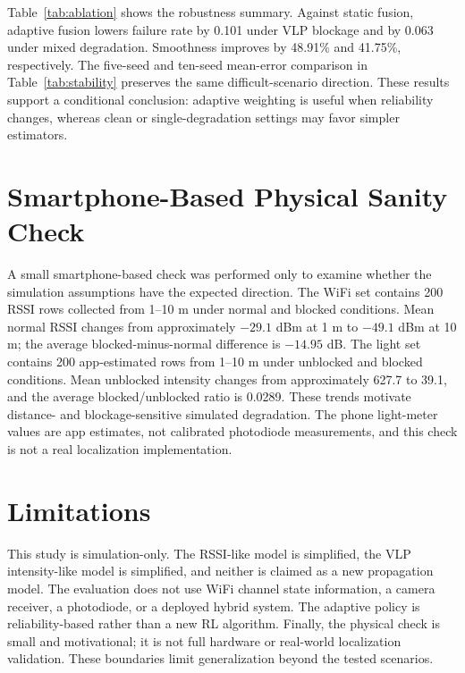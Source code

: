 \documentclass[conference]{IEEEtran}
\begin{document}
Table~\ref{tab:ablation} shows the robustness summary. Against static fusion, adaptive fusion lowers failure rate by 0.101 under VLP blockage and by 0.063 under mixed degradation. Smoothness improves by 48.91\% and 41.75\%, respectively. The five-seed and ten-seed mean-error comparison in Table~\ref{tab:stability} preserves the same difficult-scenario direction. These results support a conditional conclusion: adaptive weighting is useful when reliability changes, whereas clean or single-degradation settings may favor simpler estimators.

\begin{table}[t]
\caption{Ablation on Difficult Scenarios (lower is better)}
\label{tab:ablation}
\centering
\tiny

\end{table}
\begin{table}[t]
\caption{Mean-Error Stability as Held-Out Seeds Expand (m; lower is better)}
\label{tab:stability}
\centering
\scriptsize

\end{table}

\section{Smartphone-Based Physical Sanity Check}
A small smartphone-based check was performed only to examine whether the simulation assumptions have the expected direction. The WiFi set contains 200 RSSI rows collected from 1--10 m under normal and blocked conditions. Mean normal RSSI changes from approximately $-29.1$ dBm at 1 m to $-49.1$ dBm at 10 m; the average blocked-minus-normal difference is $-14.95$ dB. The light set contains 200 app-estimated rows from 1--10 m under unblocked and blocked conditions. Mean unblocked intensity changes from approximately 627.7 to 39.1, and the average blocked/unblocked ratio is 0.0289. These trends motivate distance- and blockage-sensitive simulated degradation. The phone light-meter values are app estimates, not calibrated photodiode measurements, and this check is not a real localization implementation.

\section{Limitations}
This study is simulation-only. The RSSI-like model is simplified, the VLP intensity-like model is simplified, and neither is claimed as a new propagation model. The evaluation does not use WiFi channel state information, a camera receiver, a photodiode, or a deployed hybrid system. The adaptive policy is reliability-based rather than a new RL algorithm. Finally, the physical check is small and motivational; it is not full hardware or real-world localization validation. These boundaries limit generalization beyond the tested scenarios.
\end{document}
